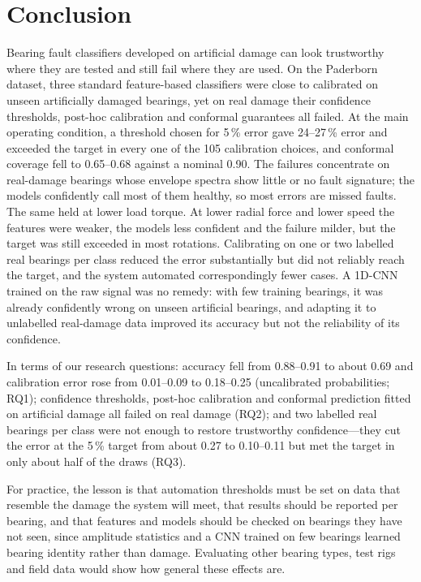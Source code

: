 \section{Conclusion}
\label{sec:conclusion}

Bearing fault classifiers developed on artificial damage can look trustworthy where they are tested and still fail
where they are used. On the Paderborn dataset, three standard feature-based classifiers were close to calibrated on unseen
artificially damaged bearings, yet on real damage their confidence thresholds, post-hoc calibration and conformal
guarantees all failed. At the main operating condition, a threshold chosen for 5\,\% error gave 24--27\,\% error and
exceeded the target in every one of the 105 calibration choices, and conformal coverage fell to 0.65--0.68 against a nominal 0.90. The failures
concentrate on real-damage bearings whose envelope spectra show little or no fault signature; the models confidently
call most of them healthy, so most errors are missed faults. The same held at lower load torque. At lower radial force and lower speed
the features were weaker, the models less confident and the failure milder, but the target was still exceeded in
most rotations. Calibrating on one or two labelled real bearings per class reduced the error substantially but did
not reliably reach the target, and the system automated correspondingly fewer cases. A 1D-CNN trained on the raw
signal was no remedy: with few training bearings, it was already confidently wrong on unseen artificial bearings,
and adapting it to unlabelled real-damage data improved its accuracy but not the reliability of its confidence.

In terms of our research questions: accuracy fell from 0.88--0.91 to about 0.69 and calibration error rose from
0.01--0.09 to 0.18--0.25 (uncalibrated probabilities; RQ1); confidence thresholds, post-hoc calibration and conformal prediction fitted on
artificial damage all failed on real damage (RQ2); and two labelled real bearings per class were not enough to restore
trustworthy confidence---they cut the error at the 5\,\% target from about 0.27 to 0.10--0.11 but met the target in
only about half of the draws (RQ3).

For practice, the lesson is that automation thresholds must be set on data that resemble the damage the system will
meet, that results should be reported per bearing, and that features and models should be checked on bearings they
have not seen, since amplitude statistics and a CNN trained on few bearings learned bearing identity rather than
damage. Evaluating other bearing types, test rigs and field data would
show how general these effects are.
